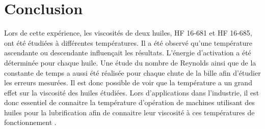 \section{Conclusion}

Lors de cette expérience, les viscosités de deux huiles, HF 16-681 et HF 16-685, ont été étudiées à différentes températures. Il a été observé qu'une température ascendante ou descendante influençait les résultats. L'énergie d'activation a été déterminée pour chaque huile. Une étude du nombre de Reynolds ainsi que de la constante de temps a aussi été réalisée pour chaque chute de la bille afin d'étudier les erreurs mesurées. Il est donc possible de voir que la température a un grand effet sur la viscosité des huiles étudiées. Lors d'applications dans l'industrie, il est donc essentiel de connaitre la température d'opération de machines utilisant des huiles pour la lubrification afin de connaitre leur viscosité à ces températures de fonctionnement \cite{lubrifiant_uwu}.
